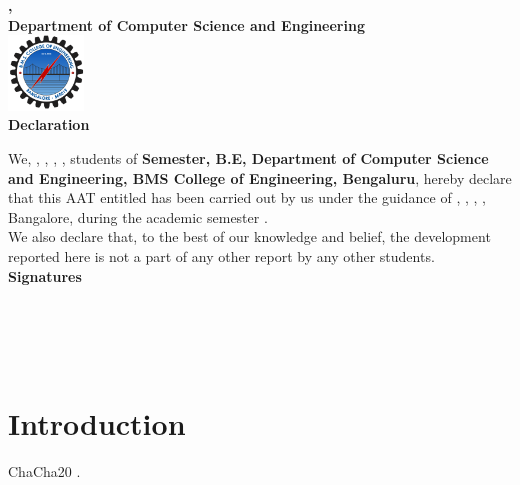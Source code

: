 \documentclass[a4paper,12pt]{report}
\begin{document}
\newpage
\begin{titlepage}
    \centering
    \textbf{\large \collegename,} \\
    \textbf{Department of Computer Science and Engineering} \\[1cm]

    \includegraphics[width=2cm]{../assets/college_logo.png} \\[1cm]

    \textbf{\LARGE Declaration} \\[1cm]
    \raggedright

    We, \textbf{\one}, \textbf{\two}, \textbf{\three}, \textbf{\four}, students of \textbf{{\semester} Semester, B.E, Department of Computer Science and Engineering, BMS College of Engineering, Bengaluru}, 
    hereby declare that this AAT entitled \textbf{\projectname } has been carried out by us under the guidance of \textbf{\guidename}, {\guidedesignation}, {\guidedept}, {\collegename}, Bangalore, during the academic semester \textbf{\academicsemester}. \\[0.5cm]

    We also declare that, to the best of our knowledge and belief, the development reported here is not a part of any other report by any other students. \\[1cm]

    \hfill \textbf{Signatures} \\[1cm]

    \textbf{\one } \\ [1cm]
    \textbf{\two } \\ [1cm]
    \textbf{\three } \\ [1cm]
    \textbf{\four } \\ [1cm]
\end{titlepage}

\newpage
\tableofcontents
\listoffigures
\listoftables

\chapter{Introduction}
ChaCha20 \cite{bernstein2008chacha}.
\end{document}
